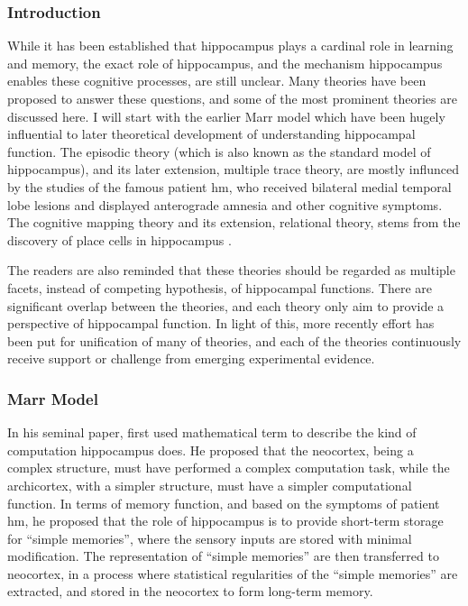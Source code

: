 \subsubsection{Introduction}
While it has been established that hippocampus plays a cardinal role in learning and memory, the exact role of hippocampus, and the mechanism hippocampus enables these cognitive processes, are still unclear. Many theories have been proposed to answer these questions, and some of the most prominent theories are discussed here. I will start with the earlier Marr model \citep{marr71} which have been hugely influential to later theoretical development of understanding hippocampal function. The episodic theory (which is also known as the standard model of hippocampus), and its later extension, multiple trace theory, are mostly influnced by the studies of the famous patient \gls{hm}, who received bilateral medial temporal lobe lesions and displayed anterograde amnesia and other cognitive symptoms. The cognitive mapping theory and its extension, relational theory, stems from the discovery of place cells in hippocampus \citep{o'keefe71}. 

The readers are also reminded that these theories should be regarded as multiple facets, instead of competing hypothesis, of hippocampal functions. There are significant overlap between the theories, and each theory only aim to provide a perspective of hippocampal function. In light of this, more recently effort has been put for unification of many of theories, and each of the theories continuously receive support or challenge from emerging experimental evidence.


\subsubsection{Marr Model \label{hpc-marr}}
In his seminal paper, \citet{marr71} first used mathematical term to describe the kind of computation hippocampus does. He proposed that the neocortex, being a complex structure, must have performed a complex computation task, while the archicortex, with a simpler structure, must have a simpler computational function. In terms of memory function, and based on the symptoms of patient \gls{hm}, he proposed that the role of hippocampus is to provide short-term storage for ``simple memories'', where the sensory inputs are stored with minimal modification. The representation of ``simple memories'' are then transferred to neocortex, in a process where statistical regularities of the ``simple memories'' are extracted, and stored in the neocortex to form long-term memory. 

